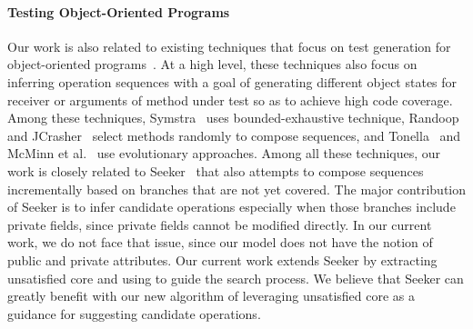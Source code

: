 \paragraph*{Testing Object-Oriented Programs} Our work is also related to existing techniques that focus on test 
generation for object-oriented programs~\cite{pacheco2007,tillmann2008,thummalapenta2011, xie:symstra,
csallner:jcrasher, phil:evo, tonella:etoc}. At a high level,
these techniques also focus on inferring operation sequences 
with a goal of generating different object states for receiver
or arguments of method under test so as to achieve high code coverage.
Among these techniques, Symstra~\cite{xie:symstra} uses
bounded-exhaustive technique, Randoop~\cite{pacheco2007} and JCrasher~\cite{csallner:jcrasher} 
select methods randomly to compose sequences, and Tonella~\cite{tonella:etoc} and McMinn et al.~\cite{phil:evo}
use evolutionary approaches. Among all
these techniques, our work is closely related to Seeker~\cite{thummalapenta2011}
that also attempts to compose sequences incrementally based on branches that
are not yet covered. The major contribution of Seeker is to infer
candidate operations especially when those branches include private fields,
since private fields cannot be modified directly. In our current work,
we do not face that issue, since our model does not have the notion of public
and private attributes. Our current work extends Seeker by extracting
unsatisfied core and using to guide the search process. 
We believe that Seeker can greatly benefit with
our new algorithm of leveraging unsatisfied core as a guidance for suggesting
candidate operations.


